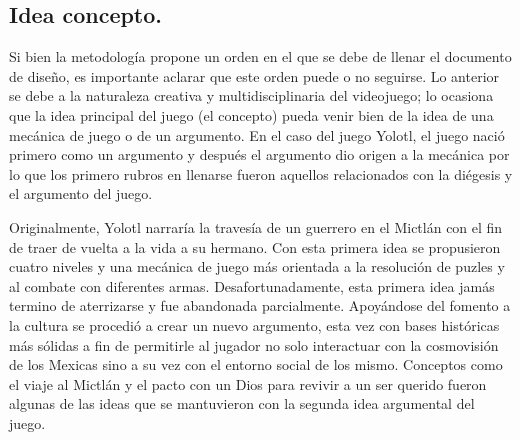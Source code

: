 \subsection{Idea concepto.}
Si bien la metodología propone un orden en el que se debe de llenar el documento de diseño, es importante aclarar que este orden puede o no seguirse. Lo anterior se debe a la naturaleza creativa y multidisciplinaria del videojuego; lo ocasiona que la idea principal del juego (el concepto) pueda venir bien de la idea de una mecánica de juego o de un argumento. En el caso del juego Yolotl, el juego nació primero como un argumento y después el argumento dio origen a la mecánica por lo que los primero rubros en llenarse fueron aquellos relacionados con la diégesis y el argumento del juego. 
\\
\par
Originalmente, Yolotl narraría la travesía de un guerrero en el Mictlán con el fin de traer de vuelta a la vida a su hermano. Con esta primera idea se propusieron cuatro niveles y una mecánica de juego más orientada a la resolución de puzles y al combate con diferentes armas. Desafortunadamente, esta primera idea jamás termino de aterrizarse y fue abandonada parcialmente. Apoyándose del fomento a la cultura se procedió a crear un nuevo argumento, esta vez con bases históricas más sólidas a fin de permitirle al jugador no solo interactuar con la cosmovisión de los Mexicas sino a su vez con el entorno social de los mismo. Conceptos como el viaje al Mictlán y el pacto con un Dios para revivir a un ser querido fueron algunas de las ideas que se mantuvieron con la segunda idea argumental del juego. 

